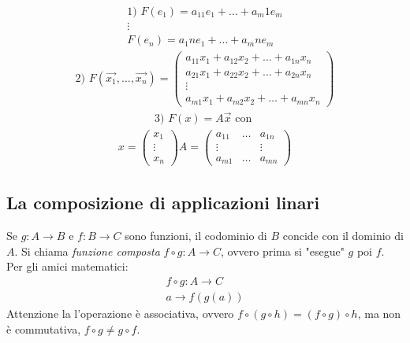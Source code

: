 \documentclass{article}
\begin{document}
\begin{align*}
  \text{1) } F(e_1)=a_11e_1+\dots+a_m1e_m \\
  \vdots \\
  F(e_n)=a_1ne_1+\dots+a_mne_m
\end{align*}
\vspace{2em}
\begin{align*}
  \text{2) } F(\vec{x_1},\dots,\vec{x_n})=
  \begin{pmatrix}
    a_{11}x_1+a_{12}x_2+\dots+a_{1n}x_n \\
    a_{21}x_1+a_{22}x_2+\dots+a_{2n}x_n \\
    \vdots \\
    a_{m1}x_1+a_{m2}x_2+\dots+a_{mn}x_n 
  \end{pmatrix}
\end{align*}
\vspace{2em}
\begin{align*}
  \text{3) }F(x)=A\vec{x} \text{ con }
\end{align*}
\begin{align*}
  x=\begin{pmatrix}
    x_1 \\
    \vdots \\
    x_n
  \end{pmatrix}
  A=\begin{pmatrix}
    a_{11} & \dots & a_{1n} \\
    \vdots & & \vdots \\
    a_{m1} & \dots & a_{mn} 
  \end{pmatrix}
\end{align*}

\vspace{1em}
\subsection{La composizione di applicazioni linari}
Se $g : A \to B$ e $f: B \to C$ sono funzioni, il codominio di $B$ concide con il dominio di $A$. Si chiama \textit{funzione composta} $f \circ g : A \to C$, ovvero prima si "esegue" $g$ poi $f$.
\\Per gli amici matematici:
\begin{align*}
  f \circ g : A \to C \\
  a \to f(g(a))
\end{align*}
Attenzione la l'operazione è associativa, ovvero $f\circ(g\circ h)=(f\circ g)\circ h$, ma non è commutativa, $f\circ g \neq g\circ f$.
\end{document}
